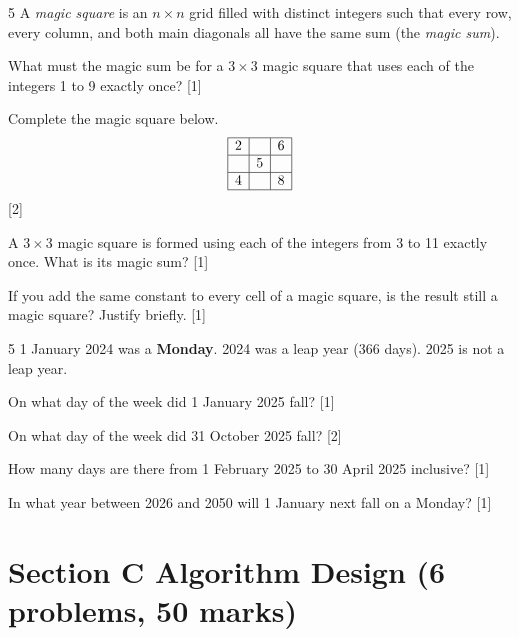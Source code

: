 \begin{problem}{5}
A \emph{magic square} is an $n \times n$ grid filled with distinct integers
such that every row, every column, and both main diagonals all have the same
sum (the \emph{magic sum}).
\begin{parts}
  \item What must the magic sum be for a $3 \times 3$ magic square that uses
        each of the integers 1 to 9 exactly once? \hfill [1]
  \item Complete the magic square below.
        \[
        \begin{array}{|c|c|c|}
        \hline
        2 & \phantom{0} & 6 \\
        \hline
        \phantom{0} & 5 & \phantom{0} \\
        \hline
        4 & \phantom{0} & 8 \\
        \hline
        \end{array}
        \]
        \hfill [2]
  \item A $3 \times 3$ magic square is formed using each of the integers from
        3 to 11 exactly once. What is its magic sum? \hfill [1]
  \item If you add the same constant to every cell of a magic square, is the
        result still a magic square? Justify briefly. \hfill [1]
\end{parts}
\answerline
\end{problem}

\begin{problem}{5}
1 January 2024 was a \textbf{Monday}. 2024 was a leap year (366 days).
2025 is not a leap year.
\begin{parts}
  \item On what day of the week did 1 January 2025 fall? \hfill [1]
  \item On what day of the week did 31 October 2025 fall? \hfill [2]
  \item How many days are there from 1 February 2025 to 30 April 2025
        inclusive? \hfill [1]
  \item In what year between 2026 and 2050 will 1 January next fall on a
        Monday? \hfill [1]
\end{parts}
\answerline
\end{problem}

\section*{Section C \quad Algorithm Design \hfill\normalsize (6 problems, 50 marks)}

